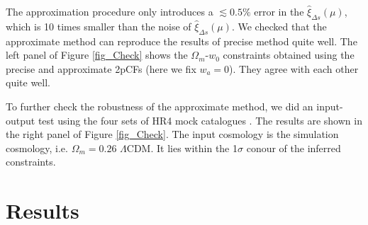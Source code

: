 \documentclass[iop]{emulateapj}
\begin{document}
The approximation procedure only introduces a $\lesssim0.5\%$ error in the $\hat\xi_{\Delta s}(\mu)$, 
which is 10 times smaller than the noise of $\hat\xi_{\Delta s}(\mu)$.
We checked that the approximate method can reproduce the results of precise method quite well.
The left panel of Figure \ref{fig_Check} shows the  $\Omega_m$-$w_0$ constraints obtained 
  using the precise and approximate 2pCFs (here we fix $w_a=0$). 
They agree with each other quite well.
  
To further check the robustness of the approximate method, 
we did an input-output test using the four sets of HR4 mock catalogues \cite{HR4}.
The results are shown in the right panel of Figure \ref{fig_Check}. 
The input cosmology is the simulation cosmology, i.e. $\Omega_m=0.26$ $\Lambda$CDM.
It lies within the 1$\sigma$ conour of the inferred constraints.

%





\section{Results}
\end{document}

